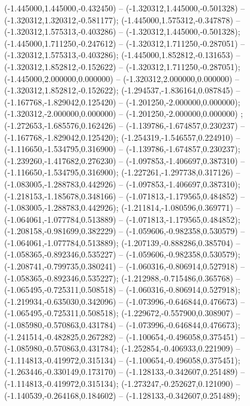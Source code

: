  (-1.445000,1.445000,-0.432450) -- (-1.320312,1.445000,-0.501328) -- (-1.320312,1.320312,-0.581177);
 (-1.445000,1.575312,-0.347878) -- (-1.320312,1.575313,-0.403286) -- (-1.320312,1.445000,-0.501328);
 (-1.445000,1.711250,-0.247612) -- (-1.320312,1.711250,-0.287051) -- (-1.320312,1.575313,-0.403286);
 (-1.445000,1.852812,-0.131653) -- (-1.320312,1.852812,-0.152622) -- (-1.320312,1.711250,-0.287051);
 (-1.445000,2.000000,0.000000) -- (-1.320312,2.000000,0.000000) -- (-1.320312,1.852812,-0.152622);
 (-1.294537,-1.836164,0.087845) -- (-1.167768,-1.829042,0.125420) -- (-1.201250,-2.000000,0.000000);
 (-1.320312,-2.000000,0.000000) -- (-1.201250,-2.000000,0.000000) ;
 (-1.272653,-1.685576,0.162426) -- (-1.139786,-1.674857,0.230237) -- (-1.167768,-1.829042,0.125420);
 (-1.254319,-1.546557,0.224910) -- (-1.116650,-1.534795,0.316900) -- (-1.139786,-1.674857,0.230237);
 (-1.239260,-1.417682,0.276230) -- (-1.097853,-1.406697,0.387310) -- (-1.116650,-1.534795,0.316900);
 (-1.227261,-1.297738,0.317126) -- (-1.083005,-1.288783,0.442926) -- (-1.097853,-1.406697,0.387310);
 (-1.218153,-1.185678,0.348166) -- (-1.071813,-1.179565,0.484852) -- (-1.083005,-1.288783,0.442926);
 (-1.211814,-1.080596,0.369771) -- (-1.064061,-1.077784,0.513889) -- (-1.071813,-1.179565,0.484852);
 (-1.208158,-0.981699,0.382229) -- (-1.059606,-0.982358,0.530579) -- (-1.064061,-1.077784,0.513889);
 (-1.207139,-0.888286,0.385704) -- (-1.058365,-0.892346,0.535227) -- (-1.059606,-0.982358,0.530579);
 (-1.208741,-0.799735,0.380241) -- (-1.060316,-0.806914,0.527918) -- (-1.058365,-0.892346,0.535227);
 (-1.212988,-0.715486,0.365768) -- (-1.065495,-0.725311,0.508518) -- (-1.060316,-0.806914,0.527918);
 (-1.219934,-0.635030,0.342096) -- (-1.073996,-0.646844,0.476673) -- (-1.065495,-0.725311,0.508518);
 (-1.229672,-0.557900,0.308907) -- (-1.085980,-0.570863,0.431784) -- (-1.073996,-0.646844,0.476673);
 (-1.241514,-0.482825,0.267282) -- (-1.100654,-0.496058,0.375451) -- (-1.085980,-0.570863,0.431784);
 (-1.252854,-0.406933,0.221909) -- (-1.114813,-0.419972,0.315134) -- (-1.100654,-0.496058,0.375451);
 (-1.263446,-0.330149,0.173170) -- (-1.128133,-0.342607,0.251489) -- (-1.114813,-0.419972,0.315134);
 (-1.273247,-0.252627,0.121090) -- (-1.140539,-0.264168,0.184602) -- (-1.128133,-0.342607,0.251489);
